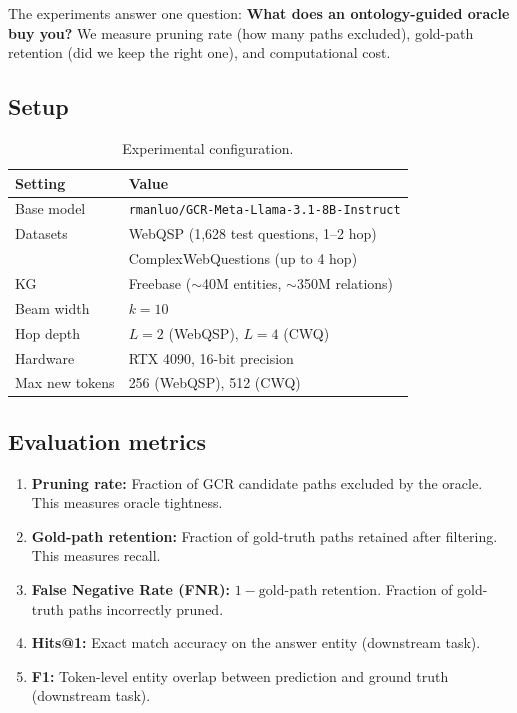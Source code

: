 \documentclass[11pt,twoside]{article}
\begin{document}
The experiments answer one question: \textbf{What does an ontology-guided oracle buy you?} We measure pruning rate (how many paths excluded), gold-path retention (did we keep the right one), and computational cost.

\subsection{Setup}

\begin{table}[H]
	\centering
	\caption{Experimental configuration.}
	\label{tab:config}
	\begin{tabular}{ll}
		\toprule
		\textbf{Setting} & \textbf{Value}                                      \\
		\midrule
		Base model       & \texttt{rmanluo/GCR-Meta-Llama-3.1-8B-Instruct}     \\
		Datasets         & WebQSP (1,628 test questions, 1--2 hop)             \\
		                 & ComplexWebQuestions (up to 4 hop)                   \\
		KG               & Freebase ($\sim$40M entities, $\sim$350M relations) \\
		Beam width       & \(k = 10\)                                          \\
		Hop depth        & \(L = 2\) (WebQSP), \(L = 4\) (CWQ)                 \\
		Hardware         & RTX 4090, 16-bit precision                          \\
		Max new tokens   & 256 (WebQSP), 512 (CWQ)                             \\
		\bottomrule
	\end{tabular}
\end{table}

\subsection{Evaluation metrics}

\begin{enumerate}
	\item \textbf{Pruning rate:} Fraction of GCR candidate paths excluded by the oracle. This measures oracle tightness.
	\item \textbf{Gold-path retention:} Fraction of gold-truth paths retained after filtering. This measures recall.
	\item \textbf{False Negative Rate (FNR):} \(1 - \text{gold-path retention}\). Fraction of gold-truth paths incorrectly pruned.
	\item \textbf{Hits@1:} Exact match accuracy on the answer entity (downstream task).
	\item \textbf{F1:} Token-level entity overlap between prediction and ground truth (downstream task).
\end{enumerate}
\end{document}
